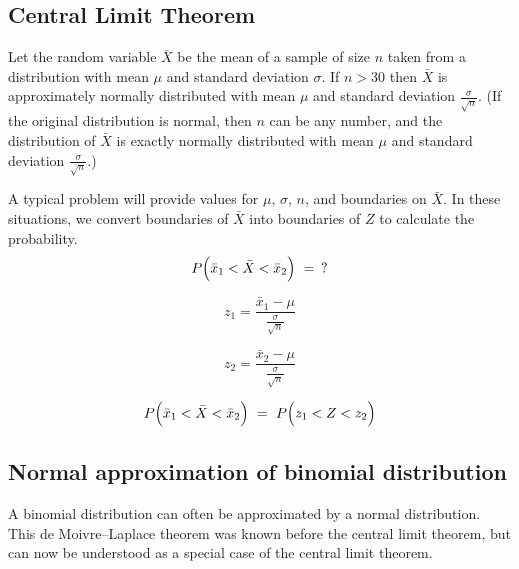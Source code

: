 \documentclass[12pt,letterpaper]{article}
\begin{document}
\begin{enumerate}[resume]
\begin{enumerate}[itemsep=50pt]
\begin{multicols}{2}
\item {}

\end{multicols}
\end{enumerate}
\end{enumerate}


\newpage
\subsection*{Central Limit Theorem}
Let the random variable $\bar{X}$ be the mean of a sample of size $n$ taken from a distribution with mean $\mu$ and standard deviation $\sigma$. If $n>30$ then $\bar{X}$ is approximately normally distributed with mean $\mu$ and standard deviation $\frac{\sigma}{\sqrt{n}}$. (If the original distribution is normal, then $n$ can be any number, and the distribution of $\bar{X}$ is exactly normally distributed with mean $\mu$ and standard deviation $\frac{\sigma}{\sqrt{n}}$.)

A typical problem will provide values for $\mu$, $\sigma$, $n$, and boundaries on $\bar{X}$. In these situations, we convert boundaries of $\bar{X}$ into boundaries of $Z$ to calculate the probability.
$$P\Bigl(\bar{x}_1 < \bar{X} < \bar{x}_2\Bigr) ~=~ \,?$$

$$z_1 = \frac{\bar{x}_1-\mu}{\frac{\sigma}{\sqrt{n}}} $$

$$z_2 = \frac{\bar{x}_2-\mu}{\frac{\sigma}{\sqrt{n}}} $$

$$P\Bigl(\bar{x}_1 < \bar{X} < \bar{x}_2\Bigr)~ = ~P\Bigl(z_1 < Z < z_2\Bigr)$$

\subsection*{Normal approximation of binomial distribution}
A binomial distribution can often be approximated by a normal distribution. This de Moivre–Laplace theorem was known before the central limit theorem, but can now be understood as a special case of the central limit theorem.
\end{document}
